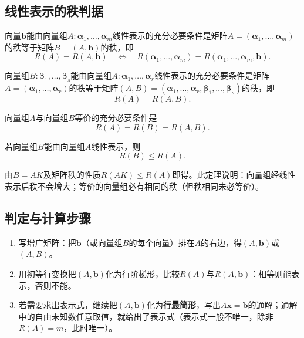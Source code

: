 \subsection{线性表示的秩判据}
\begin{theorem}[线性表示的秩判据]
向量$\boldsymbol{b}$能由向量组$A:\boldsymbol{\alpha}_1,\dots,\boldsymbol{\alpha}_m$线性表示的充分必要条件是矩阵$A=(\boldsymbol{\alpha}_1,\dots,\boldsymbol{\alpha}_m)$的秩等于矩阵$B=(A,\boldsymbol{b})$的秩，即
\[
R(A)=R(A,\boldsymbol{b})\quad\Longleftrightarrow\quad R(\boldsymbol{\alpha}_1,\dots,\boldsymbol{\alpha}_m)
=R(\boldsymbol{\alpha}_1,\dots,\boldsymbol{\alpha}_m,\boldsymbol{b}).
\]
\end{theorem}

\begin{theorem}[向量组线性表示的秩判据]
向量组$B:\boldsymbol{\beta}_1,\dots,\boldsymbol{\beta}_s$能由向量组$A:\boldsymbol{\alpha}_1,\dots,\boldsymbol{\alpha}_r$线性表示的充分必要条件是矩阵$A=(\boldsymbol{\alpha}_1,\dots,\boldsymbol{\alpha}_r)$的秩等于矩阵$(A,B)=(\boldsymbol{\alpha}_1,\dots,\boldsymbol{\alpha}_r,\boldsymbol{\beta}_1,\dots,\boldsymbol{\beta}_s)$的秩，即
\[
R(A)=R(A,B).
\]
\end{theorem}

\begin{corollary}[向量组等价的秩判据]
向量组$A$与向量组$B$等价的充分必要条件是
\[
R(A)=R(B)=R(A,B).
\]
\end{corollary}

\begin{theorem}[表示关系的秩不等式]
若向量组$B$能由向量组$A$线性表示，则
\[
R(B)\le R(A).
\]
\end{theorem}

由$B=AK$及矩阵秩的性质$R(AK)\le R(A)$即得。此定理说明：向量组经线性表示后秩不会增大；等价的向量组必有相同的秩（但秩相同未必等价）。



\subsection{判定与计算步骤}
\begin{enumerate}
    \item 写增广矩阵：把$\boldsymbol{b}$（或向量组$B$的每个向量）排在$A$的右边，得$(A,\boldsymbol{b})$或$(A,B)$。
    \item 用初等行变换把$(A,\boldsymbol{b})$化为行阶梯形，比较$R(A)$与$R(A,\boldsymbol{b})$：相等则能表示，否则不能。
    \item 若需要求出表示式，继续把$(A,\boldsymbol{b})$化为\textbf{行最简形}，写出$A\boldsymbol{x}=\boldsymbol{b}$的通解；通解中的自由未知数任意取值，就给出了表示式（表示式一般不唯一，除非$R(A)=m$，此时唯一）。
\end{enumerate}

